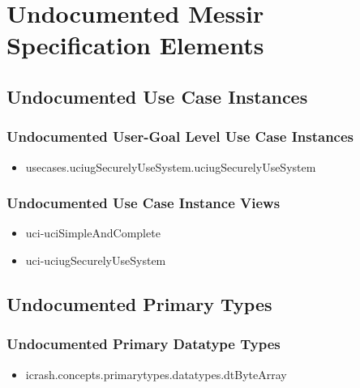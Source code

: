 	
\chapter{Undocumented Messir Specification Elements}





\section[Undocumented Use Case Instances]{Undocumented Use Case Instances}


\subsection[Undocumented Use Case Instances - User-Goal Level]{Undocumented User-Goal Level Use Case Instances}
\begin{itemize}
\item usecases.uciugSecurelyUseSystem.uciugSecurelyUseSystem 
\end{itemize}


\subsection[Undocumented Use Case Instance Views]{Undocumented Use Case Instance Views}
\begin{itemize}
\item uci-uciSimpleAndComplete 
\item uci-uciugSecurelyUseSystem 
\end{itemize}






\section[Undocumented Primary Types]{Undocumented Primary Types}


\subsection[Undocumented Primary Datatype Types]{Undocumented Primary Datatype Types}
\begin{itemize}
\item icrash.concepts.primarytypes.datatypes.dtByteArray 
\end{itemize}














